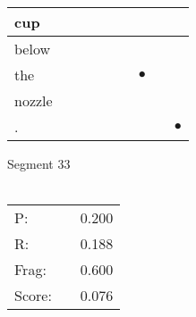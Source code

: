 \documentclass[landscape]{article}
\newcommand{\ssp}{\hspace{2pt}}
\newcommand{\mex}{\cellcolor{g}$\bullet$}
\begin{document}
\begin{tabular}{|l|p{10pt}|p{10pt}|p{10pt}|p{10pt}|p{10pt}|p{10pt}|p{10pt}|p{10pt}|}
\hline
\ssp cup \ssp&\hspace{2pt}&\hspace{2pt}&\hspace{2pt}&\hspace{2pt}&\hspace{2pt}&\hspace{2pt}&\hspace{2pt}&\hspace{2pt}\\
\hline
\ssp below \ssp&\hspace{2pt}&\hspace{2pt}&\hspace{2pt}&\hspace{2pt}&\hspace{2pt}&\hspace{2pt}&\hspace{2pt}&\hspace{2pt}\\
\hline
\ssp \cellcolor{ref5}the \ssp&\hspace{2pt}&\hspace{2pt}&\hspace{2pt}&\hspace{2pt}&\hspace{2pt}&\hspace{2pt}\mex&\hspace{2pt}&\hspace{2pt}\\
\hline
\ssp nozzle \ssp&\hspace{2pt}&\hspace{2pt}&\hspace{2pt}&\hspace{2pt}&\hspace{2pt}&\hspace{2pt}&\hspace{2pt}&\hspace{2pt}\\
\hline
\ssp \cellcolor{ref7}. \ssp&\hspace{2pt}&\hspace{2pt}&\hspace{2pt}&\hspace{2pt}&\hspace{2pt}&\hspace{2pt}&\hspace{2pt}&\hspace{2pt}\mex\\
\hline
\end{tabular}

\vspace{6pt}
\noindent Segment 33\\\\
\noindent\begin{tabular}{lm{12pt}r}
\hline
P:&&0.200\\
R:&&0.188\\
Frag:&&0.600\\
Score:&&0.076\\
\end{tabular}
\end{document}
